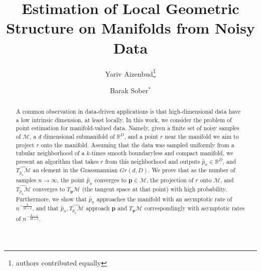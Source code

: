 \documentclass[12pt]{article}
\theoremstyle{remark}
\newcommand{\MM}{\mathcal{M}}
\begin{document}
\title{Estimation of Local Geometric Structure on Manifolds from Noisy Data}
\author[1]{Yariv Aizenbud\footnote{authors contributed equally}}
\author[2]{Barak Sober$^*$}


\maketitle

\begin{abstract}
A common observation in data-driven applications is that high-dimensional data have a low intrinsic dimension, at least locally. 
In this work, we consider the problem of point estimation for manifold-valued data.
Namely, given a finite set of noisy samples of $\mathcal{M}$, a $d$ dimensional submanifold of $\mathbb{R}^D$, and a point $r$ near the manifold we aim to project $r$ onto the manifold.
Assuming that the data was sampled uniformly from a tubular neighborhood of a $k$-times smooth boundaryless and compact manifold, we present an algorithm that takes $r$ from this neighborhood and outputs $\hat p_n\in \mathbb{R}^D$, and $\widehat{T_{\hat p_n}\mathcal{M}}$ an element in the Grassmannian $Gr(d, D)$.
We prove that as the number of samples $n\to\infty$, the point $\hat p_n$ converges to $\mathbf{p}\in \mathcal{M}$, the projection of $r$ onto $\MM$, and $\widehat{T_{\hat p_n}\mathcal{M}}$ converges to $T_{\mathbf{p}}\mathcal{M}$ (the tangent space at that point) with high probability.  
Furthermore, we show that $\hat p_n$ approaches the manifold with an asymptotic rate of $n^{-\frac{k}{2k + d}}$, and that $\hat p_n, \widehat{T_{\hat p_n}\MM}$ approach $\mathbf{p}$ and $T_{\mathbf{p}}\MM$ correspondingly with asymptotic rates of $n^{-\frac{k-1}{2k + d}}$.
\end{abstract}
\smallskip


\end{document}
